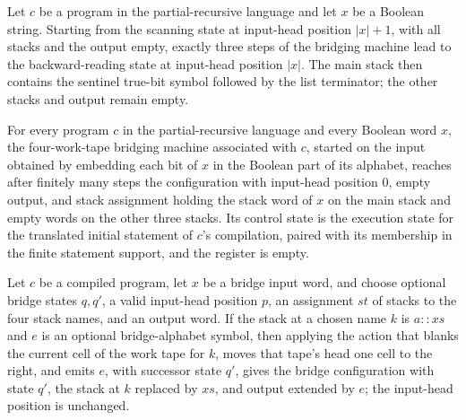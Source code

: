 \begin{lemma}
\label{Turing.bridge_seed}
\leanok
{}
Let $c$ be a program in the partial-recursive language and let $x$ be a Boolean string.
Starting from the scanning state at input-head position $|x|+1$, with all stacks and the
output empty, exactly three steps of the bridging machine lead to the backward-reading
state at input-head position $|x|$. The main stack then contains the sentinel true-bit
symbol followed by the list terminator; the other stacks and output remain empty.
\end{lemma}

\begin{lemma}
\label{Turing.bridge_start}
\leanok
{}
For every program $c$ in the partial-recursive language and every Boolean word $x$, the
four-work-tape bridging machine associated with $c$, started on the input obtained by
embedding each bit of $x$ in the Boolean part of its alphabet, reaches after finitely
many steps the configuration with input-head position $0$, empty output, and stack
assignment holding the stack word of $x$ on the main stack and empty words on the other
three stacks. Its control state is the execution state for the translated initial
statement of $c$'s compilation, paired with its membership in the finite statement
support, and the register is empty.
\end{lemma}

\begin{lemma}
\label{Turing.bridgeCfg_pop_emit}
\leanok
{}
Let $c$ be a compiled program, let $x$ be a bridge input word, and choose optional
bridge states $q,q'$, a valid input-head position $p$, an assignment $st$ of stacks to
the four stack names, and an output word. If the stack at a chosen name $k$ is $a::xs$
and $e$ is an optional bridge-alphabet symbol, then applying the action that blanks the
current cell of the work tape for $k$, moves that tape's head one cell to the right, and
emits $e$, with successor state $q'$, gives the bridge configuration with state $q'$,
the stack at $k$ replaced by $xs$, and output extended by $e$; the input-head position
is unchanged.
\end{lemma}

